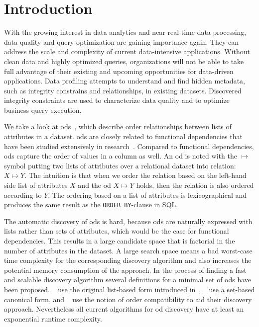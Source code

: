 
\section{Introduction}\label{sec:intro}

  With the growing interest in data analytics and near real-time data processing, data quality and query optimization are gaining importance again.
  They can address the scale and complexity of current data-intensive applications.
  Without clean data and highly optimized queries, organizations will not be able to take full advantage of their existing and upcoming opportunities for data-driven applications.
  Data profiling attempts to understand and find hidden metadata, such as integrity constrains and relationships, in existing datasets.
  Discovered integrity constraints are used to characterize data quality and to optimize business query execution.

  We take a look at \glspl{od}~\cite{ginsburg,szlichta:fundamentals}, which describe order relationships between lists of attributes in a dataset.
  \glspl{od} are closely related to functional dependencies that have been studied extensively in research~\cite{dependencies:review}.
  Compared to functional dependencies, \glspl{od} capture the order of values in a column as well.
  An \gls{od} is noted with the $\mapsto$ symbol putting two lists of attributes over a relational dataset into relation: $X \mapsto Y$.
  The intuition is that when we order the relation based on the left-hand side list of attributes $X$ and the \gls{od} $X \mapsto Y$ holds, then the relation is also ordered according to $Y$.
  The ordering based on a list of attributes is lexicographical and produces the same result as the \texttt{ORDER BY}-clause in SQL.

  The automatic discovery of \glspl{od} is hard, because \glspl{od} are naturally expressed with lists rather than sets of attributes, which would be the case for functional dependencies.
  This results in a large candidate space that is factorial in the number of attributes in the dataset.
  A large search space means a bad worst-case time complexity for the corresponding discovery algorithm and also increases the potential memory consumption of the approach.
  In the process of finding a fast and scalable discovery algorithm several definitions for a minimal set of \glspl{od} have been proposed.
  ~\cite{langer} use the original list-based form introduced in~\cite{szlichta:fundamentals}, \citeauthor{szlichta:discovery}~\cite{szlichta:discovery} use a set-based canonical form, and \citeauthor{consonni}~\cite{consonni} use the notion of order compatibility to aid their discovery approach.
  Nevertheless all current algorithms for \gls{od} discovery have at least an exponential runtime complexity.

